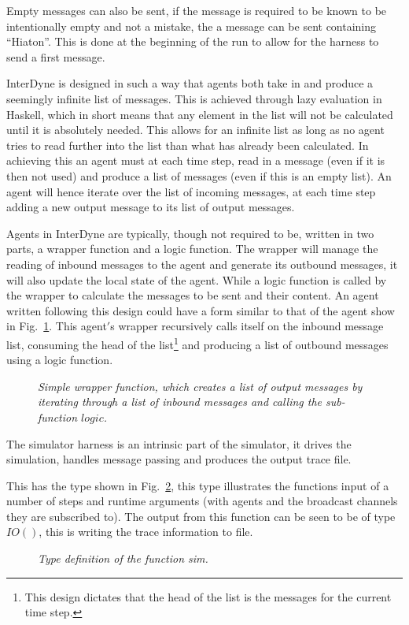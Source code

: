 \documentclass{article}
\begin{document}
Empty messages can also be sent, if the message is required to be known to be intentionally empty and not a mistake, the a message can be sent containing ``Hiaton''. This is done at the beginning of the run to allow for the harness to send a first message. 

InterDyne is designed in such a way that agents both take in and produce a seemingly infinite list of messages. This is achieved through lazy evaluation in Haskell, which in short means that any element in the list will not be calculated until it is absolutely needed. This allows for an infinite list as long as no agent tries to read further into the list than what has already been calculated. In achieving this an agent must at each time step, read in a message (even if it is then not used) and produce a list of messages (even if this is an empty list). An agent will hence iterate over the list of incoming messages, at each time step adding a new output message to its list of output messages.  

Agents in InterDyne are typically, though not required to be, written in two parts, a wrapper function and a logic function. The wrapper will manage the reading of inbound messages to the agent and generate its outbound messages, it will also update the local state of the agent. While a logic function is called by the wrapper to calculate the messages to be sent and their content. An agent written following this design could have a form similar to that of the agent show in Fig.~\ref{fig:wrapperfrominterdyne}. This agent$'$s wrapper recursively calls itself on the inbound message list, consuming the head of the list\footnote{This design dictates that the head of the list is the messages for the current time step.} and producing a list of outbound messages using a logic function.  
\begin{figure}[H]
	\centering
        
	\caption{\it Simple wrapper function, which creates a list of output messages by iterating through a list of inbound messages and calling the sub-function $logic$.}
	\label{fig:wrapperfrominterdyne}
\end{figure} 

The simulator harness is an intrinsic part of the simulator, it drives the simulation, handles message passing and produces the output trace file.

This has the type shown in Fig.~\ref{fig:harntypintfirst}, this type illustrates the functions input of a number of steps and runtime arguments (with agents and the broadcast channels they are subscribed to). The output from this function can be seen to be of type $IO()$, this is writing the trace information to file.  
\begin{figure}[H]
	\centering
        
	\caption{\it Type definition of the function sim.}
	\label{fig:harntypintfirst}
\end{figure} 
\end{document}
